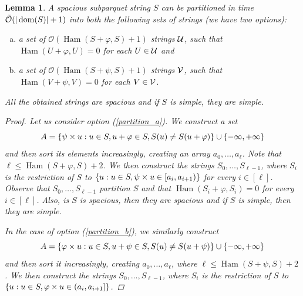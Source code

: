 \documentclass[11pt]{article}
\renewcommand{\O}{\mathcal{O}}
\newcommand{\tO}{\tilde{\mathcal{O}}}
\renewcommand{\phi}{\varphi}
\newcommand{\set}[1]{\left\lbrace #1 \right\rbrace}
\theoremstyle{plain}
\newtheorem{lemma}{Lemma}
\theoremstyle{definition}
\theoremstyle{remark}
\DeclareMathOperator*{\Ham}{Ham}
\begin{document}
\begin{lemma}\label{cut_partitioning}
	A spacious subparquet string $S$ can be partitioned in time $\tO(|\d{S}| + 1)$ into both the following sets of strings (we have two options):
	\begin{enumerate}[a)]
		\item a set of $\O(\Ham(S + \phi, S) + 1)$ strings $\mathcal{U}$, such that $\Ham(U + \phi, U) = 0$ for each $U \in \mathcal{U}$ and \label{partition_a}
		\item a set of $\O(\Ham(S + \psi, S) + 1)$ strings $\mathcal{V}$, such that $\Ham(V + \psi, V) = 0$ for each $V \in \mathcal{V}$. \label{partition_b}
	\end{enumerate}
	All the obtained strings are spacious and if $S$ is simple, they are simple.
	\begin{proof}
		Let us consider option (\ref{partition_a}). We construct a set
		\[ A = \set{\s{u} : u \in S, u + \phi \in S, S(u) \neq S(u + \phi)} \cup \set{-\infty, +\infty}\]
		and then sort its elements increasingly, creating an array $a_0, \dots, a_\ell$.
		Note that $\ell \le \Ham(S + \phi, S) + 2$.
		We then construct the strings $S_0, \dots, S_{\ell - 1}$, where $S_i$ is the restriction of $S$ to
		$\set{u : u \in S, \s{u} \in [a_i, a_{i + 1})}$ for every $i \in [\ell]$.
		Observe that $S_0, \dots, S_{\ell - 1}$ partition $S$ and that $\Ham(S_i + \phi, S_i) = 0$ for every $i \in [\ell]$.
		Also, is $S$ is spacious, then they are spacious and if $S$ is simple, then they are simple.
	
		In the case of option (\ref{partition_b}), we similarly construct
		\[ A = \set{\h{u} : u \in S, u + \psi \in S, S(u) \neq S(u + \psi)} \cup \set{-\infty, +\infty} \]
		and then sort it increasingly, creating $a_0, \dots, a_\ell$, where $\ell \le \Ham(S + \psi, S) + 2$.
		We then construct the strings $S_0, \dots, S_{\ell - 1}$, where $S_i$ is the restriction of $S$ to 
		$\set{u : u \in S, \h{u} \in (a_i, a_{i + 1}]}$.
	\end{proof}
\end{lemma}
\end{document}
